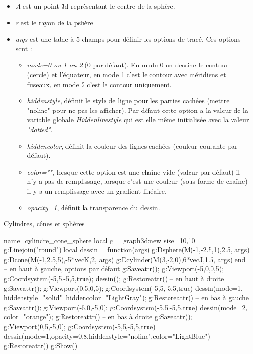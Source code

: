 \begin{itemize}
    \item \emph{A} est un point 3d représentant le centre de la sphère.
    \item \emph{r} est le rayon de la pshère
    \item \emph{args} est une table à 5 champs pour définir les options de tracé. Ces options sont :
        \begin{itemize}
            \item \emph{mode=0 ou 1 ou 2} (0 par défaut). En mode 0 on dessine le contour (cercle) et l'équateur, en mode 1 c'est le contour avec méridiens et fuseaux, en mode 2 c'est le contour uniquement.
            \item \emph{hiddenstyle}, définit le style de ligne pour les parties cachées (mettre "noline" pour ne pas les afficher). Par défaut cette option a la valeur de la variable globale \emph{Hiddenlinestyle} qui est elle même initialisée avec la valeur \emph{"dotted"}.
            \item \emph{hiddencolor}, définit la couleur des lignes cachées (couleur courante par défaut).
            \item \emph{color=""}, lorsque cette option est une chaîne vide (valeur par défaut) il n'y a pas de remplissage,  lorsque c'est une couleur (sous forme de chaîne) il y a un remplissage avec un gradient linéaire.
            \item \emph{opacity=1}, définit la transparence du dessin.
        \end{itemize}
\end{itemize}

\begin{demo}{Cylindres, cônes et sphères}
\begin{luadraw}{name=cylindre_cone_sphere}
local g = graph3d:new{ size={10,10} }
g:Linejoin("round")
local dessin = function(args)
    g:Dsphere(M(-1,-2.5,1),2.5, args)
    g:Dcone(M(-1,2.5,5),-5*vecK,2, args)
    g:Dcylinder(M(3,-2,0),6*vecJ,1.5, args)
end
-- en haut à gauche, options par défaut
g:Saveattr(); g:Viewport(-5,0,0,5); g:Coordsystem(-5,5,-5,5,true); dessin(); g:Restoreattr()
-- en haut à droite
g:Saveattr(); g:Viewport(0,5,0,5); g:Coordsystem(-5,5,-5,5,true)
dessin({mode=1, hiddenstyle="solid", hiddencolor="LightGray"}); g:Restoreattr()
-- en bas à gauche
g:Saveattr(); g:Viewport(-5,0,-5,0); g:Coordsystem(-5,5,-5,5,true)
dessin({mode=2, color="orange"}); g:Restoreattr()
-- en bas à droite
g:Saveattr(); g:Viewport(0,5,-5,0); g:Coordsystem(-5,5,-5,5,true)
dessin({mode=1,opacity=0.8,hiddenstyle="noline",color="LightBlue"}); g:Restoreattr()
g:Show()            
\end{luadraw}
\end{demo}

